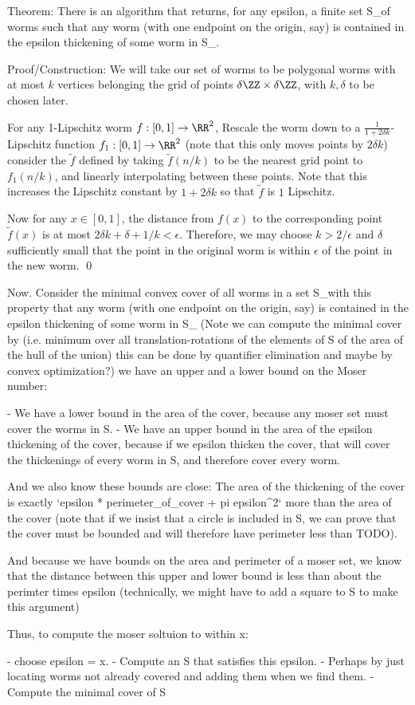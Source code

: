 Theorem: There is an algorithm that returns, for any epsilon, a finite set S\_\epsilon of worms such that any worm (with one endpoint on the origin, say) is contained in the epsilon thickening of some worm in S\_\epsilon.

Proof/Construction: We will take our set of worms to be polygonal worms with at most $k$ vertices belonging the grid of points $\delta \ZZ \times \delta \ZZ$, with $k, \delta$ to be chosen later.

For any 1-Lipschitz worm $f: [0,1] \to \RR^2$,
Rescale the worm down to a $\frac{1}{1 + 2\delta k}$-Lipschitz function $f_1: [0,1] \to \RR^2$ (note that this only moves points by $2\delta k$)
consider the $\tilde{f}$ defined by taking $\tilde{f}(n/k)$ to be the nearest grid point to $f_1(n/k)$, and linearly interpolating between these points.
Note that this increases the Lipschitz constant by $1 + 2\delta k$ so that $\tilde{f}$ is $1$ Lipschitz.

Now for any $x \in [0,1]$, the distance from $f(x)$ to the corresponding point $\tilde{f}(x)$ is at most $2\delta k + \delta + 1/k < \epsilon $. Therefore, we may choose $k > 2/\epsilon$ and $\delta$ sufficiently small that the point in the original worm is within $\epsilon$ of the point in the new worm.
\qed

Now.
Consider the minimal convex cover of all worms in a set S\_\epsilon with this property that any worm (with one endpoint on the origin, say) is contained in the epsilon thickening of some worm in S\_\epsilon
(Note we can compute the minimal cover by (i.e. minimum over all translation-rotations of the elements of S of the area of the hull of the union) this can be done by quantifier elimination and maybe by convex optimization?)
we have an upper and a lower bound on the Moser number:

- We have a lower bound in the area of the cover, because any moser set must cover the worms in S.
- We have an upper bound in the area of the epsilon thickening of the cover, because if we epsilon thicken the cover, that will cover the thickenings of every worm in S, and therefore cover every worm.

And we also know these bounds are close: The area of the thickening of the cover is exactly `epsilon * perimeter_of_cover + pi epsilon^2` more than the area of the cover (note that if we insist that a circle is included in S, we can prove that the cover must be bounded and will therefore have perimeter less than TODO).

And because we have bounds on the area and perimeter of a moser set, we know that the distance between this upper and lower bound is less than about the perimter times epsilon (technically, we might have to add a square to S to make this argument)

Thus, to compute the moser soltuion to within x:

- choose epsilon = x.
- Compute an S that satisfies this epsilon.
  - Perhaps by just locating worms not already covered and adding them when we find them.
- Compute the minimal cover of S
